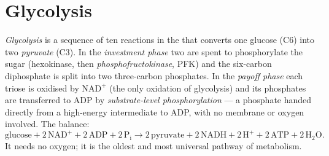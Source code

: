 \section{Glycolysis}

\begin{definition}[Glycolysis]\label{def:b1:respiration-fermentation:glycolysis}
\emph{Glycolysis} is a sequence of ten  reactions in the 
that converts one glucose (C6) into two \emph{pyruvate} (C3). In the
\emph{investment phase} two  are spent to phosphorylate the sugar
(hexokinase, then \emph{phosphofructokinase}, PFK) and the six-carbon
diphosphate is split into two three-carbon phosphates. In the
\emph{payoff phase} each triose is oxidised by $\mathrm{NAD^+}$ (the
only oxidation of glycolysis) and its phosphates are transferred to ADP
by \emph{substrate-level phosphorylation} --- a phosphate handed directly from a high-energy
intermediate to ADP, with no membrane or oxygen involved. The balance:
\[
\text{glucose} + 2\,\mathrm{NAD^+} + 2\,\mathrm{ADP} + 2\,\mathrm{P_i}
\to 2\,\text{pyruvate} + 2\,\mathrm{NADH} + 2\,\mathrm{H^+} + 2\,\mathrm{ATP} + 2\,\mathrm{H_2O} .
\]
It needs no oxygen; it is the oldest and most universal pathway of
metabolism.
\end{definition}

